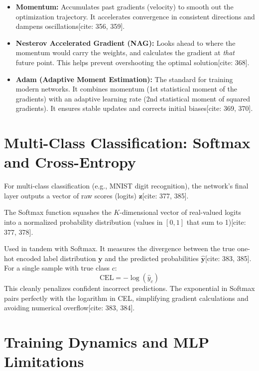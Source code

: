 \begin{itemize}
    \item \textbf{Momentum:} Accumulates past gradients (velocity) to smooth out the optimization trajectory. It accelerates convergence in consistent directions and dampens oscillations[cite: 356, 359].
    \item \textbf{Nesterov Accelerated Gradient (NAG):} Looks ahead to where the momentum would carry the weights, and calculates the gradient at \textit{that} future point. This helps prevent overshooting the optimal solution[cite: 368].
    \item \textbf{Adam (Adaptive Moment Estimation):} The standard for training modern networks. It combines momentum (1st statistical moment of the gradients) with an adaptive learning rate (2nd statistical moment of squared gradients). It ensures stable updates and corrects initial biases[cite: 369, 370].
\end{itemize}

\section*{Multi-Class Classification: Softmax and Cross-Entropy}

For multi-class classification (e.g., MNIST digit recognition), the network's final layer outputs a vector of raw scores (logits) $\mathbf{z}$[cite: 377, 385].

\begin{definition}
The Softmax function squashes the $K$-dimensional vector of real-valued logits into a normalized probability distribution (values in $[0,1]$ that sum to 1)[cite: 377, 378].
\end{definition}

\begin{definition}
Used in tandem with Softmax. It measures the divergence between the true one-hot encoded label distribution $\mathbf{y}$ and the predicted probabilities $\hat{\mathbf{y}}$[cite: 383, 385]. For a single sample with true class $c$:
$$\text{CEL} = -\log(\hat{y}_c)$$
This cleanly penalizes confident incorrect predictions. The exponential in Softmax pairs perfectly with the logarithm in CEL, simplifying gradient calculations and avoiding numerical overflow[cite: 383, 384].
\end{definition}

\section*{Training Dynamics and MLP Limitations}

